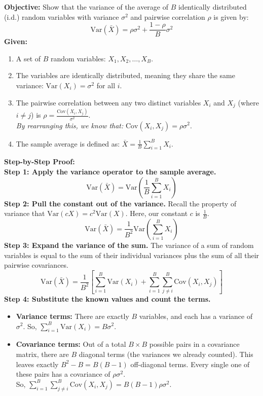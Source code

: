 \documentclass[twoside, 10pt]{article}
\begin{document}
\textbf{Objective:} Show that the variance of the average of $B$ identically distributed (i.d.) random variables with variance $\sigma^2$ and pairwise correlation $\rho$ is given by:
\[
\text{Var}(\bar{X}) = \rho\sigma^2 + \frac{1 - \rho}{B}\sigma^2
\]
\textbf{Given:}
\begin{enumerate}
    \item A set of $B$ random variables: $X_1, X_2, \dots, X_B$.
    \item The variables are identically distributed, meaning they share the same variance: $\text{Var}(X_i) = \sigma^2$ for all $i$.
    \item The pairwise correlation between any two distinct variables $X_i$ and $X_j$ (where $i \neq j$) is $\rho = \frac{\text{Cov}(X_i, X_j)}{\sigma^2}$. \\
    \textit{By rearranging this, we know that:} $\text{Cov}(X_i, X_j) = \rho\sigma^2$.
    \item The sample average is defined as: $\bar{X} = \frac{1}{B} \sum_{i=1}^B X_i$.
\end{enumerate}
\textbf{Step-by-Step Proof:}\\
\textbf{Step 1: Apply the variance operator to the sample average.}
\[
\text{Var}(\bar{X}) = \text{Var}\left( \frac{1}{B} \sum_{i=1}^B X_i \right)
\]
\textbf{Step 2: Pull the constant out of the variance.}
Recall the property of variance that $\text{Var}(cX) = c^2\text{Var}(X)$. Here, our constant $c$ is $\frac{1}{B}$.
\[
\text{Var}(\bar{X}) = \frac{1}{B^2} \text{Var}\left( \sum_{i=1}^B X_i \right)
\]
\textbf{Step 3: Expand the variance of the sum.}
The variance of a sum of random variables is equal to the sum of their individual variances plus the sum of all their pairwise covariances.
\[
\text{Var}(\bar{X}) = \frac{1}{B^2} \left[ \sum_{i=1}^B \text{Var}(X_i) + \sum_{i=1}^B \sum_{j \neq i}^B \text{Cov}(X_i, X_j) \right]
\]
\textbf{Step 4: Substitute the known values and count the terms.}
\begin{itemize}
    \item \textbf{Variance terms:} There are exactly $B$ variables, and each has a variance of $\sigma^2$. So, $\sum_{i=1}^B \text{Var}(X_i) = B\sigma^2$.
    \item \textbf{Covariance terms:} Out of a total $B \times B$ possible pairs in a covariance matrix, there are $B$ diagonal terms (the variances we already counted). This leaves exactly $B^2 - B = B(B-1)$ off-diagonal terms. Every single one of these pairs has a covariance of $\rho\sigma^2$. \\
    So, $\sum_{i=1}^B \sum_{j \neq i}^B \text{Cov}(X_i, X_j) = B(B-1)\rho\sigma^2$.
\end{itemize}
\end{document}
